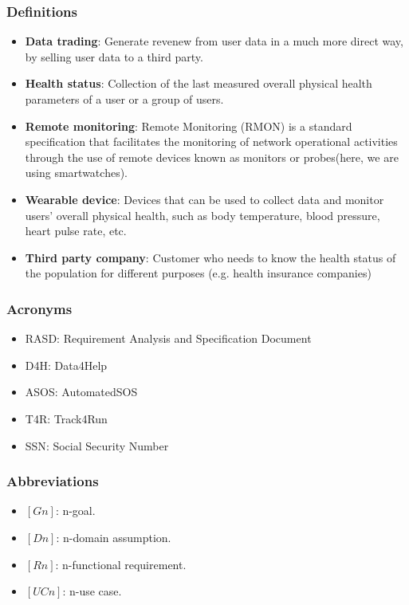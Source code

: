 \documentclass[12pt]{article}
\begin{document}
\subsubsection{Definitions}
\begin{itemize}
\item{\textbf{Data trading}}: Generate revenew from user data in a much more direct way, by selling user data to a third party.
\item{\textbf{Health status}}: Collection of the last measured overall physical health parameters of a user or a group of users.
\item{\textbf{Remote monitoring}}: Remote Monitoring (RMON) is a standard specification that facilitates the monitoring of network operational activities through the use of remote devices known as monitors or probes(here, we are using smartwatches).
\item{\textbf{Wearable device}}: Devices that can be used to collect data and monitor users' overall physical health, such as body temperature, blood pressure, heart pulse rate, etc.
\item{\textbf{Third party company}}: Customer who needs to know the health status of the population for different purposes (e.g. health insurance companies)
\end{itemize}

\subsubsection{Acronyms}
\begin{itemize}
\item{RASD}: Requirement Analysis and Specification Document
\item{D4H}: Data4Help
\item{ASOS}: AutomatedSOS
\item{T4R}: Track4Run
\item{SSN}: Social Security Number
\end{itemize}

\subsubsection{Abbreviations}
\begin{itemize}
\item $[Gn]$: n-goal. 
\item $[Dn]$: n-domain assumption. 
\item $[Rn]$: n-functional requirement. 
\item $[UCn]$: n-use case. 
\end{itemize} 
\end{document}
